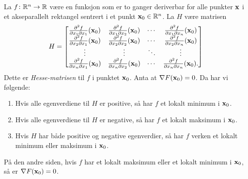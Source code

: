 \begin{teorem}[Andrederiverttesten]
  La $f \colon \mathbb{R}^n \to \mathbb{R}$ være en funksjon som er to ganger deriverbar for
  alle punkter $\mathbf{x}$ i et akseparallelt rektangel sentrert i et punkt $\mathbf{x}_0 \in
  \mathbb{R}^n$. 
  La $H$ være matrisen
  $$H = \begin{bmatrix}
    \frac{\partial^2 f}{\partial x_1 \partial x_1}(\mathbf{x}_0) & \frac{\partial^2 f}{\partial x_1 \partial x_2}(\mathbf{x}_0) & \cdots & \frac{\partial^2 f}{\partial x_1 \partial x_n}(\mathbf{x}_0) \\
    \frac{\partial^2 f}{\partial x_2 \partial x_1}(\mathbf{x}_0) & \frac{\partial^2 f}{\partial x_2 \partial x_2}(\mathbf{x}_0) & \cdots & \frac{\partial^2 f}{\partial x_2 \partial x_n}(\mathbf{x}_0) \\
    \vdots & \vdots & \ddots & \vdots \\
    \frac{\partial^2 f}{\partial x_n \partial x_1}(\mathbf{x}_0) & \frac{\partial^2 f}{\partial x_n \partial x_2}(\mathbf{x}_0) & \cdots & \frac{\partial^2 f}{\partial x_n \partial x_n}(\mathbf{x}_0).
    \end{bmatrix}$$
    Dette er {\em Hesse-matrisen} til $f$ i punktet $\mathbf{x}_0$. Anta at $\nabla F(\mathbf{x}_0) = 0$.
    Da har vi følgende:
    \begin{enumerate}
      \item Hvis alle egenverdiene til $H$ er positive, så har $f$ et lokalt minimum i $\mathbf{x}_0$.
      \item Hvis alle egenverdiene til $H$ er negative, så har $f$ et lokalt maksimum i $\mathbf{x}_0$.
      \item Hvis $H$ har både positive og negative egenverdier, så har $f$
        verken et lokalt minimum eller maksimum i $\mathbf{x}_0$.
    \end{enumerate} 

    På den andre siden, hvis $f$ har et lokalt maksimum eller et lokalt minimum i
    $\mathbf{x}_0$, så er $\nabla F(\mathbf{x}_0) = 0$.
\end{teorem}
